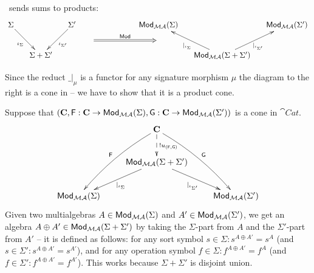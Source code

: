 \begin{lemma}\label{le:sumtoprod}
\Mod\ sends sums to products:
\[\xymatrix@C=0.5cm@R=0.3cm{
\Sigma \ar[ddr]_{\iota_{\Sigma}} && \Sigma' \ar[ddl]^{\iota_{\Sigma'}} &&&&
   \Mod_{\inst{MA}}(\Sigma) && \Mod_{\inst{MA}}(\Sigma')	\\ && &\ar@{=>}[rrr]^{\Mod}&&& \\
& {\Sigma + \Sigma'} & &&&&	
   & \Mod_{\inst{MA}}(\Sigma + \Sigma') \ar[uul]^{|_{\iota_{\Sigma}}} \ar[uur]_{|_{\iota_{\Sigma'}}}	
								}
\]
\end{lemma}
\begin{PROOF}
Since the reduct $\_|_\mu$ is a functor for any signature morphism $\mu$ the
diagram to the right is a cone in  -- 
we have to show that it %
is a product
cone.

Suppose that $({\bf C}, {\sf {F}}:{\bf C} \to
{\sf {Mod}}_{{\mathcal{MA}}}(\Sigma),{\sf {G}}:{\bf C} \to {\sf {Mod}}_{{\mathcal{MA}}}(\Sigma'))$ is a
cone in $\cat{Cat}$.  
\[\xymatrix{
& \cat{C} \ar@/_/[ddl]_{\fu{F}} \ar@/^/[ddr]^{\fu{G}} \ar@{-->}[d]^{!u_{(\fu{F},\fu{G})}} \\
& \Mod_{\inst{MA}}(\Sigma + \Sigma') \ar[dl]^{|_{\iota_{\Sigma}}} \ar[dr]_{|_{\iota_{\Sigma'}}}	\\
\Mod_{\inst{MA}}(\Sigma) && \Mod_{\inst{MA}}(\Sigma')
}
\]
Given two multialgebras $A\in{\sf {Mod}}_{{\mathcal{MA}}}(\Sigma)$
and  $A'\in{\sf {Mod}}_{{\mathcal{MA}}}(\Sigma')$, we get an algebra $A\oplus A'\in
{\sf {Mod}}_{{\mathcal{MA}}}(\Sigma+\Sigma')$ by taking the $\Sigma$-part from $A$ and
the $\Sigma'$-part from $A'$ -- it is defined as follows: 
 for any sort symbol $s\in\Sigma:s^{A\oplus A'}=s^A$ (and $s\in\Sigma':s^{A\oplus
 A'}=s^{A'}$), and  for any operation symbol $f\in\Sigma:f^{A\oplus A'}=f^A$ (and $f\in\Sigma':f^{A\oplus
A'}=f^{A'}$). This works because $\Sigma+\Sigma'$ is disjoint union.


\end{PROOF}
